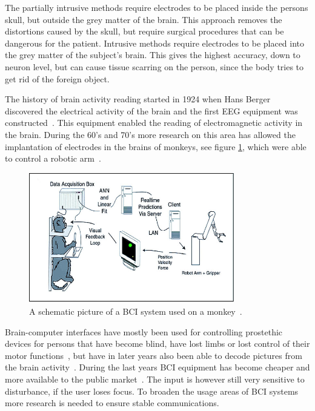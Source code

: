 The partially intrusive methods require electrodes to be placed inside the persons skull, but outside the grey matter of the brain. This approach removes the distortions caused by the skull, but require surgical procedures that can be dangerous for the patient. Intrusive methods require electrodes to be placed into the grey matter of the subject's brain. This gives the highest accuracy, down to neuron level, but can cause tissue scarring on the person, since the body tries to get rid of the foreign object.

The history of brain activity reading started in 1924 when Hans Berger discovered the electrical activity of the brain and the first EEG equipment was constructed~\cite{haas2003hans}. This equipment enabled the reading of electromagnetic activity in the brain. During the 60's and 70's more research on this area has allowed the implantation of electrodes in the brains of monkeys, see figure \ref{apa}, which were able to control a robotic arm~\cite{GeorgopoulosLuritoPetridesEtAl89,lebedev2005cortical}. 

\begin{figure}[]
\includegraphics[width=0.8\textwidth] {bilder/apa.jpg}
\caption{A schematic picture of a BCI system used on a monkey~\cite{apa}.}
\label{apa}
\end{figure}

Brain-computer interfaces have mostly been used for controlling prostethic devices for persons that have become blind, have lost limbs or lost control of their motor functions~\cite{lebedev2006brain}, but have in later years also been able to decode pictures from the brain activity~\cite{miyawaki2008visual}.
During the last years BCI equipment has become cheaper and more available to the public market~\cite{legobrain}. The input is however still very sensitive to disturbance, if the user loses focus. To broaden the usage areas of BCI systems more research is needed to ensure stable communications.

